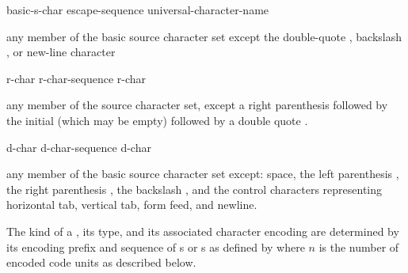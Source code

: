 \begin{bnf}
\br
    basic-s-char\br
    escape-sequence\br
    universal-character-name
\end{bnf}

\begin{bnf}
\br
    \textnormal{any member of the basic source character set except the double-quote , backslash \terminal{\textbackslash}, or new-line character}
\end{bnf}

\begin{bnf}
\br
      \literalterminal{(}  \literalterminal{)}  
\end{bnf}

\begin{bnf}
\br
    r-char\br
    r-char-sequence r-char
\end{bnf}

\begin{bnf}
\br
    \textnormal{any member of the source character set, except a right parenthesis \terminal{)} followed by}\br
    \bnfindent\textnormal{the initial  (which may be empty) followed by a double quote .}
\end{bnf}

\begin{bnf}
\br
    d-char\br
    d-char-sequence d-char
\end{bnf}

\begin{bnf}
\br
    \textnormal{any member of the basic source character set except:}\br
    \bnfindent\textnormal{space, the left parenthesis \terminal{(}, the right parenthesis \terminal{)}, the backslash \terminal{\textbackslash}, and the control characters}\br
    \bnfindent\textnormal{representing horizontal tab, vertical tab, form feed, and newline.}
\end{bnf}

\pnum
{}%
%
%
%
%
%
%
%
%
The kind of a ,
its type, and
its associated character encoding
are determined by its encoding prefix and sequence of
s or s
as defined by 
where $n$ is the number of encoded code units as described below.


